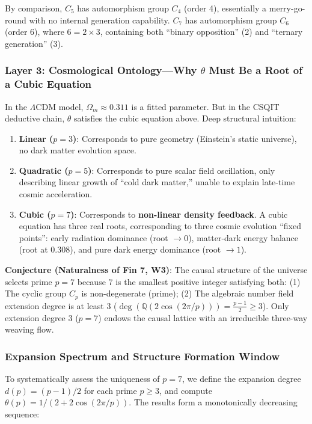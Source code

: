\documentclass[aps,prd,twocolumn,nofootinbib,floatfix]{revtex4-2}
\begin{document}
By comparison, $C_5$ has automorphism group $C_4$ (order 4), essentially a merry-go-round with no internal generation capability. $C_7$ has automorphism group $C_6$ (order 6), where $6 = 2 \times 3$, containing both ``binary opposition'' (2) and ``ternary generation'' (3).

\subsubsection{Layer 3: Cosmological Ontology---Why $\theta$ Must Be a Root of a Cubic Equation}

In the $\Lambda$CDM model, $\Omega_m \approx 0.311$ is a fitted parameter. But in the CSQIT deductive chain, $\theta$ satisfies the cubic equation above. Deep structural intuition:
\begin{enumerate}
    \item \textbf{Linear ($p=3$)}: Corresponds to pure geometry (Einstein's static universe), no dark matter evolution space.
    \item \textbf{Quadratic ($p=5$)}: Corresponds to pure scalar field oscillation, only describing linear growth of ``cold dark matter,'' unable to explain late-time cosmic acceleration.
    \item \textbf{Cubic ($p=7$)}: Corresponds to \textbf{non-linear density feedback}. A cubic equation has three real roots, corresponding to three cosmic evolution ``fixed points'': early radiation dominance (root $\to 0$), matter-dark energy balance (root at 0.308), and pure dark energy dominance (root $\to 1$).
\end{enumerate}

\textbf{Conjecture (Naturalness of Fin 7, W3)}: The causal structure of the universe selects prime $p=7$ because $7$ is the smallest positive integer satisfying both: (1) The cyclic group $C_p$ is non-degenerate (prime); (2) The algebraic number field extension degree is at least 3 ($\deg(\mathbb{Q}(2\cos(2\pi/p))) = \frac{p-1}{2} \ge 3$). Only extension degree 3 ($p=7$) endows the causal lattice with an irreducible three-way weaving flow.

\subsubsection{Expansion Spectrum and Structure Formation Window}

To systematically assess the uniqueness of $p=7$, we define the expansion degree $d(p) = (p-1)/2$ for each prime $p \ge 3$, and compute $\theta(p) = 1/(2+2\cos(2\pi/p))$. The results form a monotonically decreasing sequence:
\end{document}
